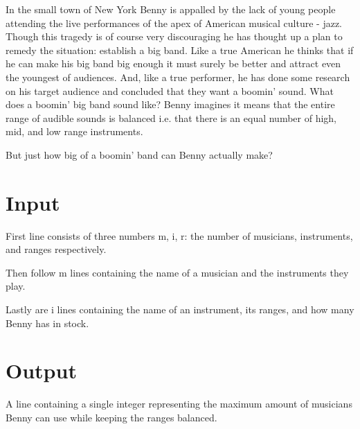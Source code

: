 
In the small town of New York Benny is appalled by the lack of young people attending the live performances of the apex of American musical culture - jazz. Though this tragedy is of course very discouraging he has thought up a plan to remedy the situation: establish a big band. Like a true American he thinks that if he can make his big band big enough it must surely be better and attract even the youngest of audiences. And, like a true performer, he has done some research on his target audience and concluded that they want a boomin' sound. What does a boomin' big band sound like? Benny imagines it means that the entire range of audible sounds is balanced i.e. that there is an equal number of high, mid, and low range instruments.

But just how big of a boomin' band can Benny actually make?

\section*{Input}

First line consists of three numbers m, i, r: the number of musicians, instruments, and ranges respectively.

Then follow m lines containing the name of a musician and the instruments they play.

Lastly are i lines containing the name of an instrument, its ranges, and how many Benny has in stock.

\section*{Output}

A line containing a single integer representing the maximum amount of musicians Benny can use while keeping the ranges balanced.
